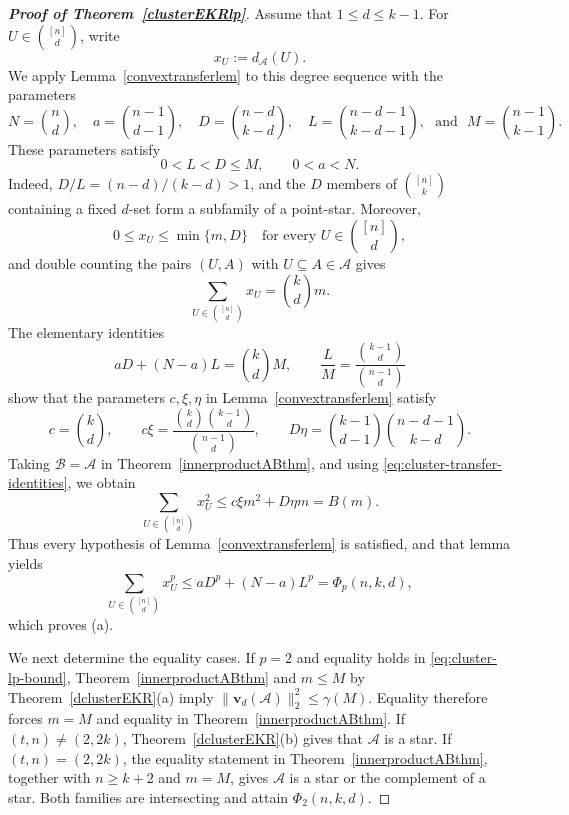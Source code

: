 \documentclass[11pt]{article}
\numberwithin{equation}{section}
\def\A{\mathcal{A}}
\def\v{\mathbf{v}}
\begin{document}
\begin{proof}[{\bf Proof of Theorem~\ref{clusterEKRlp}}]
Assume that $1\leq d\leq k-1$.
For $U\in\binom{[n]}d$, write
	\[
	x_U:=d_\A(U).
	\]
We apply Lemma~\ref{convextransferlem} to this degree sequence with the parameters
\begin{equation}\label{eq:cluster-transfer-parameters}
N=\binom nd, \quad a =\binom{n-1}{d-1}, \quad D=\binom{n-d}{k-d},	\quad
L =\binom{n-d-1}{k-d-1}, \text{~ and ~}M =\binom{n-1}{k-1}.
	\end{equation}
	These parameters satisfy
	\[
	0<L<D\leq M,
	\qquad
	0<a<N.
	\]
Indeed, $D/L=(n-d)/(k-d)>1$, and the $D$ members of $\binom{[n]}k$ containing a fixed $d$-set form a subfamily of a point-star.
Moreover,
	\[
	0\leq x_U\leq\min\{m,D\}
	\quad\text{for every }U\in\binom{[n]}d,
	\]
and double counting the pairs $(U,A)$ with $U\subseteq A\in\A$ gives
	\begin{equation}\label{eq:cluster-first-moment}
		\sum_{U\in\binom{[n]}d}x_U=\binom kd m.
	\end{equation}
The elementary identities
	\[
	aD+(N-a)L=\binom kd M,
	\qquad
	\frac LM=\frac{\binom{k-1}d}{\binom{n-1}d}
	\]
show that the parameters $c,\xi,\eta$ in
Lemma~\ref{convextransferlem} satisfy
	\begin{equation}\label{eq:cluster-transfer-identities}
		c=\binom kd,
		\qquad
		c\xi=\frac{\binom kd\binom{k-1}d}{\binom{n-1}d},
		\qquad
		D\eta=\binom{k-1}{d-1}\binom{n-d-1}{k-d}.
	\end{equation}
	Taking $\mathcal B=\mathcal A$ in
	Theorem~\ref{innerproductABthm}, and using
	\eqref{eq:cluster-transfer-identities}, we obtain
	\begin{equation}\label{eq:cluster-second-moment}
		\sum_{U\in\binom{[n]}d}x_U^2
		\leq c\xi m^2+D\eta m= B(m).
	\end{equation}
	Thus every hypothesis of Lemma~\ref{convextransferlem} is satisfied,
	and that lemma yields
	\[
	\sum_{U\in\binom{[n]}d}x_U^p
	\leq aD^p+(N-a)L^p
	=\Phi_p(n,k,d),
	\]
which proves (a). %
	

We next determine the equality cases.
If $p=2$ and equality holds in \eqref{eq:cluster-lp-bound}, Theorem~\ref{innerproductABthm} and $m\leq M$ by Theorem~\ref{dclusterEKR}(a) imply
$\|\v_d(\A)\|_2^2\leq \gamma(M).$
Equality therefore forces $m=M$ and equality in
Theorem~\ref{innerproductABthm}.
If $(t,n)\neq(2,2k)$,
Theorem~\ref{dclusterEKR}(b) gives that $\A$ is a star.  If
	$(t,n)=(2,2k)$, the equality statement in
Theorem~\ref{innerproductABthm}, together with $n\geq k+2$ and
$m=M$,
gives $\A$ is a star or the complement of a star.
Both families are intersecting and attain $\Phi_2(n,k,d)$.
	

\end{proof}
\end{document}
